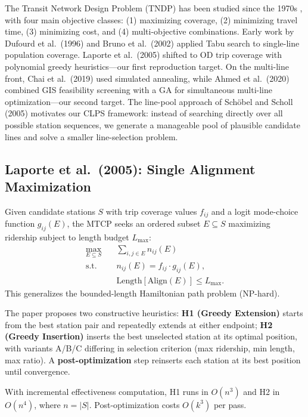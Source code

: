 \documentclass[conference]{IEEEtran}
\begin{document}
The Transit Network Design Problem (TNDP) has been studied since the 1970s
\cite{vuchic1968}, with four main objective classes: (1) maximizing coverage,
(2) minimizing travel time, (3) minimizing cost, and (4) multi-objective
combinations. Early work by Dufourd et al.\ (1996) and Bruno et al.\
(2002) applied Tabu search to single-line population coverage. Laporte et
al.\ (2005) shifted to OD trip coverage with polynomial greedy
heuristics---our first reproduction target. On the multi-line front, Chai
et al.\ (2019) used simulated annealing, while Ahmed et al.\ (2020)
combined GIS feasibility screening with a GA for simultaneous multi-line
optimization---our second target. The line-pool approach of Sch\"{o}bel and
Scholl (2005) motivates our CLPS framework: instead of searching directly
over all possible station sequences, we generate a manageable pool of
plausible candidate lines and solve a smaller line-selection problem.

\subsection{Laporte et al.\ (2005): Single Alignment Maximization}

Given candidate stations $S$ with trip coverage values $f_{ij}$ and a
logit mode-choice function $g_{ij}(E)$, the MTCP seeks an ordered subset
$E \subseteq S$ maximizing ridership subject to length budget $L_{\max}$:
\begin{equation}
\begin{aligned}
\max_{E \subseteq S} \quad & \sum_{i,j \in E} n_{ij}(E) \\
\text{s.t.} \quad
& n_{ij}(E) = f_{ij} \cdot g_{ij}(E), \\
& \text{Length}[\text{Align}(E)] \leq L_{\max}.
\end{aligned}
\label{eq:mtcp}
\end{equation}
This generalizes the bounded-length Hamiltonian path problem (NP-hard).

The paper proposes two constructive heuristics: \textbf{H1 (Greedy
Extension)} starts from the best station pair and repeatedly extends at
either endpoint; \textbf{H2 (Greedy Insertion)} inserts the best
unselected station at its optimal position, with variants A/B/C differing
in selection criterion (max ridership, min length, max ratio). A
\textbf{post-optimization} step reinserts each station at its best
position until convergence.

With incremental effectiveness computation, H1 runs in $O(n^3)$ and H2 in
$O(n^4)$, where $n = |S|$. Post-optimization costs $O(k^3)$ per pass.
\end{document}
